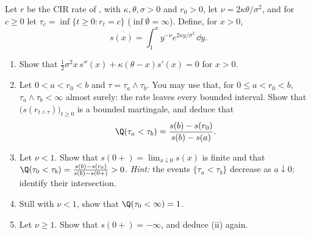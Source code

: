 \begin{exercise}\label{ex:ir-feller-fails}
\hard Let $r$ be the CIR rate of , with $\kappa,\theta,\sigma>0$ and $r_0>0$, let
$\nu=2\kappa\theta/\sigma^2$, and for $c\ge0$ let $\tau_c=\inf\{t\ge0:r_t=c\}$ ($\inf\emptyset=\infty$).
Define, for $x>0$,
\[
  s(x)=\int_1^xy^{-\nu}e^{2\kappa y/\sigma^2}\,\dd y .
\]
\begin{enumerate}[label=(\alph*)]
  \item Show that $\frac12\sigma^2x\,s''(x)+\kappa(\theta-x)s'(x)=0$ for $x>0$.
  \item Let $0<a<r_0<b$ and $\tau=\tau_a\wedge\tau_b$. You may use that, for $0\le a<r_0<b$,
    $\tau_a\wedge\tau_b<\infty$ almost surely: the rate leaves every bounded interval. Show that $\big(s(r_{t\wedge\tau})\big)_{t\ge0}$ is a bounded martingale, and deduce that
    \[
      \Q(\tau_a<\tau_b)=\frac{s(b)-s(r_0)}{s(b)-s(a)} .
    \]
  \item Let $\nu<1$. Show that $s(0+)=\lim_{x\downarrow0}s(x)$ is finite and that
    $\Q(\tau_0<\tau_b)=\frac{s(b)-s(r_0)}{s(b)-s(0+)}>0$. \emph{Hint:} the events $\{\tau_a<\tau_b\}$
    decrease as $a\downarrow0$; identify their intersection.
  \item Still with $\nu<1$, show that $\Q(\tau_0<\infty)=1$.
  \item Let $\nu\ge1$. Show that $s(0+)=-\infty$, and deduce (ii) again.
\end{enumerate}
\end{exercise}

